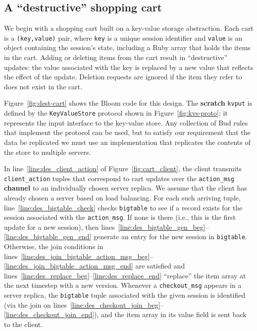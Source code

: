 \subsection{A ``destructive'' shopping cart}

We begin with a shopping cart built on a key-value storage abstraction.  Each
cart is a \texttt{(key,value)} pair, where \texttt{key} is a unique session
identifier and \texttt{value} is an object containing the session's state,
including a Ruby array that holds the items in the cart. Adding or deleting
items from the cart result in ``destructive'' updates: the value associated with
the key is replaced by a new value that reflects the effect of the
update. Deletion requests are ignored if the item they refer to does not exist
in the cart.

Figure~\ref{fig:dest-cart} shows the Bloom code for this design.  The
\textbf{scratch} \texttt{kvput} is defined by the \texttt{KeyValueStore} protocol shown
in Figure~\ref{fig:kvs-proto}; it represents the input interface to the key-value store.
Any collection of Bud rules that implement the protocol can be used, but to satisfy
our requirement that the data be replicated we must use an implementation that replicates
the contents of the store to multiple servers.

In line~\ref{line:des_client_action} of Figure~\ref{fig:cart_client}, the client transmits
\texttt{client\_action} tuples that correspond to cart updates over the
\texttt{action\_msg} \textbf{channel} to an individually chosen server replica.
We assume that the client has already chosen a server based on load balancing.
For each such arriving tuple, line~\ref{line:des_bigtable_check} checks
\texttt{bigtable} to see if a record exists for the session associated with the
\texttt{action\_msg}.  If none is there (i.e., this is the first update for a
new session), then
lines~\ref{line:des_bigtable_gen_beg}--\ref{line:des_bigtable_gen_end}
generate an entry for the new session in \texttt{bigtable}.  Otherwise, the
join conditions in
lines~\ref{line:des_join_bigtable_action_msg_beg}--\ref{line:des_join_bigtable_action_msg_end}
are satisfied and lines~\ref{line:des_replace_beg}--\ref{line:des_replace_end}
``replace'' the item array at the next timestep with a new version.  
Whenever a \texttt{checkout\_msg} appears in a server replica, the
\texttt{bigtable} tuple associated with the given session is identified (via
the join on
lines~\ref{line:des_checkout_join_beg}--\ref{line:des_checkout_join_end}), and
the item array in its value field is sent back to the client.  


